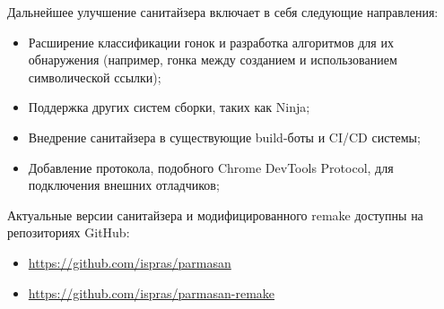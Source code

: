 Дальнейшее улучшение санитайзера включает в себя следующие направления:

\begin{itemize}
    \item Расширение классификации гонок и разработка алгоритмов для их обнаружения (например, гонка между созданием и использованием символической ссылки);
    \item Поддержка других систем сборки, таких как Ninja;
    \item Внедрение санитайзера в существующие build-боты и CI/CD системы;
    \item Добавление протокола, подобного Chrome DevTools Protocol, для подключения внешних отладчиков;
\end{itemize}

Актуальные версии санитайзера и модифицированного remake доступны на репозиториях GitHub:

\begin{itemize}
    \item \url{https://github.com/ispras/parmasan}
    \item \url{https://github.com/ispras/parmasan-remake}
\end{itemize}
